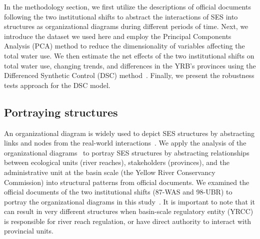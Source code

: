 
In the methodology section, we first utilize the descriptions of official documents following the two institutional shifts to abstract the interactions of SES into structures as organizational diagrams during different periods of time.
Next, we introduce the dataset we used here and employ the Principal Components Analysis (PCA) method to reduce the dimensionality of variables affecting the total water use.
We then estimate the net effects of the two institutional shifts on total water use, changing trends, and differences in the YRB's provinces using the Differenced Synthetic Control (DSC) method~\cite{arkhangelsky2021}.
Finally, we present the robustness tests approach for the DSC model.

\subsection{Portraying structures}\label{sec:structures}

An organizational diagram is widely used to depict SES structures by abstracting links and nodes from the real-world interactions~\cite{wang2022g,bodin2017a,kluger2020,guerrero2015}.
We apply the analysis of the organizational diagrams~\cite{bodin2017b} to portray SES structures by abstracting relationships between ecological units (river reaches), stakeholders (provinces), and the administrative unit at the basin scale (the Yellow River Conservancy Commission) into structural patterns from official documents.
We examined the official documents of the two institutional shifts (87-WAS and 98-UBR) to portray the organizational diagrams in this study~\cite{bodin2017a,kluger2020,guerrero2015}.
It is important to note that it can result in very different structures when basin-scale regulatory entity (YRCC) is responsible for river reach regulation, or have direct authority to interact with provincial units.

